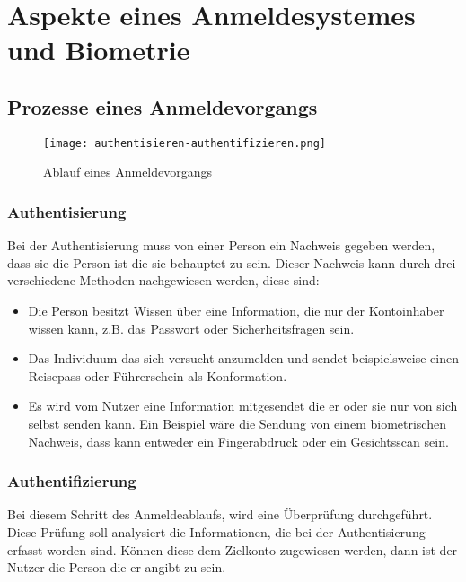 \chapter{Aspekte eines Anmeldesystemes und Biometrie}
\strahlhofer

\section{Prozesse eines Anmeldevorgangs}
\begin{center}
\begin{figure}[h]
    \centering
    \texttt{[image: authentisieren-authentifizieren.png]}
    \caption{Ablauf eines Anmeldevorgangs}
\end{figure}
\end{center}

\subsection{Authentisierung}
Bei der Authentisierung muss von einer Person ein Nachweis gegeben werden, dass sie die Person ist die sie behauptet zu sein. Dieser Nachweis kann durch drei verschiedene Methoden nachgewiesen werden, diese sind:
\begin{itemize}
	\item Die Person besitzt Wissen über eine Information, die nur der Kontoinhaber wissen kann, z.B. das Passwort oder Sicherheitsfragen sein.
	\item Das Individuum das sich versucht anzumelden und sendet beispielsweise einen Reisepass oder Führerschein als Konformation.
	\item Es wird vom Nutzer eine Information mitgesendet die er oder sie nur von sich selbst senden kann. Ein Beispiel wäre die Sendung von einem biometrischen Nachweis, dass kann entweder ein Fingerabdruck oder ein Gesichtsscan sein.
\end{itemize}

\subsection{Authentifizierung}
Bei diesem Schritt des Anmeldeablaufs, wird eine Überprüfung durchgeführt. Diese Prüfung soll analysiert die Informationen, die bei der Authentisierung erfasst worden sind. Können diese dem Zielkonto zugewiesen werden, dann ist der Nutzer die Person die er angibt zu sein.

